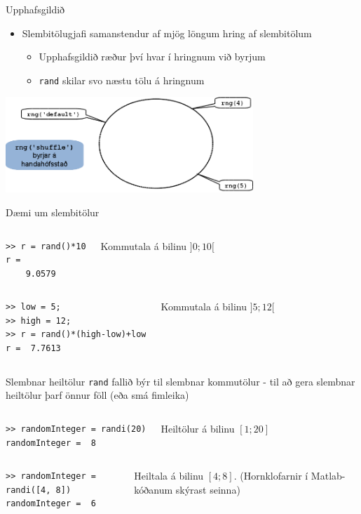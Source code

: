\documentclass[handout]{beamer}
\begin{document}
\begin{frame}[shrink]{Upphafsgildið}
\vspace{2cm}
\begin{itemize}
 \item Slembitölugjafi samanstendur af mjög löngum hring af slembitölum
 \begin{itemize}
  \item Upphafsgildið ræður því hvar í hringnum við byrjum
  \item \texttt{rand} skilar svo næstu tölu á hringnum
 \end{itemize}
\end{itemize}
\begin{center}
\includegraphics[width=0.7\textwidth]{Pics/random-circle}
\end{center}
\end{frame}

\begin{frame}[fragile]{Dæmi um slembitölur}
\begin{columns}
\begin{verbatim}
>> r = rand()*10
r =
    9.0579
\end{verbatim}
Kommutala á bilinu $]0;10[$
\end{columns}

\begin{columns}
\begin{verbatim}
>> low = 5;
>> high = 12;
>> r = rand()*(high-low)+low
r =  7.7613
\end{verbatim}
Kommutala á bilinu $]5;12[$
\end{columns}
\end{frame}

\begin{frame}[fragile]{Slembnar heiltölur}
\texttt{rand} fallið býr til slembnar kommutölur - til að gera slembnar heiltölur þarf önnur föll (eða smá fimleika)
\begin{columns}
\begin{verbatim}
>> randomInteger = randi(20)
randomInteger =  8
\end{verbatim}
Heiltölur á bilinu $[1;20]$
\end{columns}

\begin{columns}
\begin{verbatim}
>> randomInteger = randi([4, 8])
randomInteger =  6
\end{verbatim}
Heiltala á bilinu $[4; 8]$. (Hornklofarnir í Matlab-kóðanum skýrast seinna)
\end{columns}
\end{frame}
\end{document}
